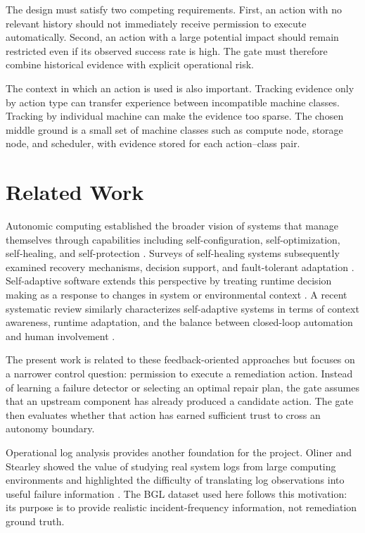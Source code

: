 \documentclass[conference]{IEEEtran}
\begin{document}
The design must satisfy two competing requirements. First, an action with no
relevant history should not immediately receive permission to execute
automatically. Second, an action with a large potential impact should remain
restricted even if its observed success rate is high. The gate must therefore
combine historical evidence with explicit operational risk.

The context in which an action is used is also important. Tracking evidence
only by action type can transfer experience between incompatible machine
classes. Tracking by individual machine can make the evidence too sparse. The
chosen middle ground is a small set of machine classes such as compute node,
storage node, and scheduler, with evidence stored for each action--class pair.

\section{Related Work}
Autonomic computing established the broader vision of systems that manage
themselves through capabilities including self-configuration, self-optimization,
self-healing, and self-protection \cite{kephart}. Surveys of self-healing
systems subsequently examined recovery mechanisms, decision support, and
fault-tolerant adaptation \cite{huebscher,ghosh}. Self-adaptive software
extends this perspective by treating runtime decision making as a response to
changes in system or environmental context \cite{macias,krupitzer}. A recent
systematic review similarly characterizes self-adaptive systems in terms of
context awareness, runtime adaptation, and the balance between closed-loop
automation and human involvement \cite{wong}.

The present work is related to these feedback-oriented approaches but focuses
on a narrower control question: permission to execute a remediation action.
Instead of learning a failure detector or selecting an optimal repair plan,
the gate assumes that an upstream component has already produced a candidate
action. The gate then evaluates whether that action has earned sufficient
trust to cross an autonomy boundary.

Operational log analysis provides another foundation for the project.
Oliner and Stearley showed the value of studying real system logs from large
computing environments and highlighted the difficulty of translating log
observations into useful failure information \cite{oliner}. The BGL dataset
used here follows this motivation: its purpose is to provide realistic
incident-frequency information, not remediation ground truth.
\end{document}
